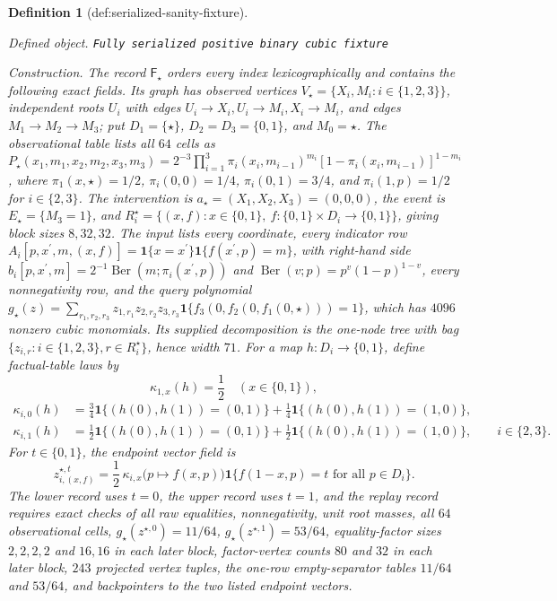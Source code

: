 \documentclass{article}
\newtheorem{definition}{Definition}
\begin{document}
\begin{definition}[def:serialized-sanity-fixture]\label{def:serialized-sanity-fixture}
\par\smallskip\noindent\emph{Defined object.} \texttt{Fully serialized positive binary cubic fixture}
\par\smallskip\noindent\emph{Construction.} The record \(\mathsf F_\star\) orders every index lexicographically and contains the following exact fields. Its graph has observed vertices \(V_\star=\{X_i,M_i:i\in\{1,2,3\}\}\), independent roots \(U_i\) with edges \(U_i\to X_i,U_i\to M_i,X_i\to M_i\), and edges \(M_1\to M_2\to M_3\); put \(D_1=\{\star\}\), \(D_2=D_3=\{0,1\}\), and \(M_0=\star\). The observational table lists all \(64\) cells as \(P_\star(x_1,m_1,x_2,m_2,x_3,m_3)=2^{-3}\prod_{i=1}^3\pi_i(x_i,m_{i-1})^{m_i}[1-\pi_i(x_i,m_{i-1})]^{1-m_i}\), where \(\pi_1(x,\star)=1/2\), \(\pi_i(0,0)=1/4\), \(\pi_i(0,1)=3/4\), and \(\pi_i(1,p)=1/2\) for \(i\in\{2,3\}\). The intervention is \(a_\star=(X_1,X_2,X_3)=(0,0,0)\), the event is \(E_\star=\{M_3=1\}\), and \(R_i^\star=\{(x,f):x\in\{0,1\},\ f:\{0,1\}\times D_i\to\{0,1\}\}\), giving block sizes \(8,32,32\). The input lists every coordinate, every indicator row \(A_i[p,x^{\prime},m,(x,f)]=\mathbf 1\{x=x^{\prime}\}\mathbf 1\{f(x^{\prime},p)=m\}\), with right-hand side \(b_i[p,x^{\prime},m]=2^{-1}\operatorname{Ber}(m;\pi_i(x^{\prime},p))\) and \(\operatorname{Ber}(v;p)=p^v(1-p)^{1-v}\), every nonnegativity row, and the query polynomial \(g_\star(z)=\sum_{r_1,r_2,r_3}z_{1,r_1}z_{2,r_2}z_{3,r_3}\mathbf 1\{f_3(0,f_2(0,f_1(0,\star)))=1\}\), which has \(4096\) nonzero cubic monomials. Its supplied decomposition is the one-node tree with bag \(\{z_{i,r}:i\in\{1,2,3\},r\in R_i^\star\}\), hence width \(71\). For a map \(h:D_i\to\{0,1\}\), define factual-table laws by
\[
\kappa_{1,x}(h)=\frac12\quad(x\in\{0,1\}),
\]
\[
\begin{aligned}
\kappa_{i,0}(h)
&=\frac34\mathbf 1\{(h(0),h(1))=(0,1)\}
+\frac14\mathbf 1\{(h(0),h(1))=(1,0)\},\\
\kappa_{i,1}(h)
&=\frac12\mathbf 1\{(h(0),h(1))=(0,1)\}
+\frac12\mathbf 1\{(h(0),h(1))=(1,0)\},
\qquad i\in\{2,3\}.
\end{aligned}
\]
For \(t\in\{0,1\}\), the endpoint vector field is
\[
z_{i,(x,f)}^{\star,t}
=\frac12\,\kappa_{i,x}\bigl(p\mapsto f(x,p)\bigr)
\mathbf 1\{f(1-x,p)=t\text{ for all }p\in D_i\}.
\]
The lower record uses \(t=0\), the upper record uses \(t=1\), and the replay record requires exact checks of all raw equalities, nonnegativity, unit root masses, all \(64\) observational cells, \(g_\star(z^{\star,0})=11/64\), \(g_\star(z^{\star,1})=53/64\), equality-factor sizes \(2,2,2,2\) and \(16,16\) in each later block, factor-vertex counts \(80\) and \(32\) in each later block, \(243\) projected vertex tuples, the one-row empty-separator tables \(11/64\) and \(53/64\), and backpointers to the two listed endpoint vectors.
\end{definition}
\end{document}
